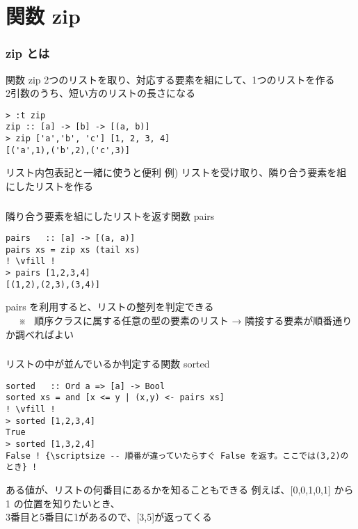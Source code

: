 \documentclass[dvipdfmx,cjk,xcolor=dvipsnames,envcountsect,notheorems,12pt]{beamer}
\theoremstyle{definition}
\begin{document}
\section{関数 zip}

\begin{frame}[fragile]
\frametitle{zip とは}
\begin{block}{関数 zip}
2つのリストを取り、対応する要素を組にして、1つのリストを作る
\\ 2引数のうち、短い方のリストの長さになる
\end{block}
\begin{lstlisting}
> :t zip
zip :: [a] -> [b] -> [(a, b)]
> zip ['a','b', 'c'] [1, 2, 3, 4]
[('a',1),('b',2),('c',3)]
\end{lstlisting}
リスト内包表記と一緒に使うと便利
\vfill
 例) リストを受け取り、隣り合う要素を組にしたリストを作る
\end{frame}

\begin{frame}[fragile]
\frametitle{}
\begin{exampleblock}{隣り合う要素を組にしたリストを返す関数 pairs}
\begin{lstlisting}[frame=none, escapechar=!]
pairs   :: [a] -> [(a, a)]
pairs xs = zip xs (tail xs)
! \vfill !
> pairs [1,2,3,4]
[(1,2),(2,3),(3,4)]
\end{lstlisting}
\end{exampleblock} %
\vfill
pairs を利用すると、リストの整列を判定できる
\\ ~ {\scriptsize ~※~  順序クラスに属する任意の型の要素のリスト}
\vfill
→ 隣接する要素が順番通りか調べればよい
\vfill
\end{frame}

\begin{frame}[fragile]
\frametitle{}
\begin{exampleblock}{リストの中が並んでいるか判定する関数 sorted}
\begin{lstlisting}[frame=none, escapechar=!]
sorted   :: Ord a => [a] -> Bool
sorted xs = and [x <= y | (x,y) <- pairs xs]
! \vfill !
> sorted [1,2,3,4]
True
> sorted [1,3,2,4]
False ! {\scriptsize -- 順番が違っていたらすぐ False を返す。ここでは(3,2)のとき} !
\end{lstlisting}
\vfill
\end{exampleblock}
\vfill
ある値が、リストの何番目にあるかを知ることもできる
\vfill
例えば、[0,0,1,0,1] から 1 の位置を知りたいとき、
\\ 3番目と5番目に1があるので、[3,5]が返ってくる
\end{frame}
\end{document}
